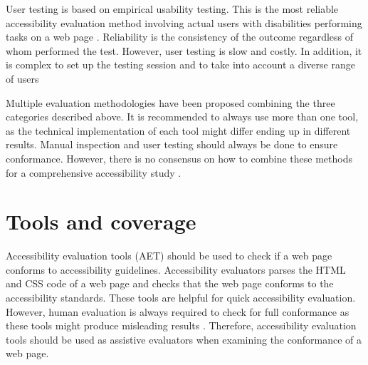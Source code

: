 User testing is based on empirical usability testing. This is the most reliable accessibility evaluation method involving actual users with disabilities performing tasks on a web page \citep[Chapter~26.2]{webaccessibility}. Reliability is the consistency of the outcome regardless of whom performed the test. However, user testing is slow and costly. In addition, it is complex to set up the testing session and to take into account a diverse range of users \citep{comparative_accessibility_methods}

Multiple evaluation methodologies have been proposed combining the three categories described above. It is recommended to always use more than one tool, as the technical implementation of each tool might differ ending up in different results. Manual inspection and user testing should always be done to ensure conformance. However, there is no consensus on how to combine these methods for a comprehensive accessibility study \citep[Chapter~26.2.1]{webaccessibility}.

\section{Tools and coverage}

Accessibility evaluation tools (AET) should be used to check if a web page conforms to accessibility guidelines. Accessibility evaluators parses the HTML and CSS code of a web page and checks that the web page conforms to the accessibility standards. These tools are helpful for quick accessibility evaluation. However, human evaluation is always required to check for full conformance as these tools might produce misleading results \citep{wcagevaluationtools}. Therefore, accessibility evaluation tools should be used as assistive evaluators when examining the conformance of a web page.

